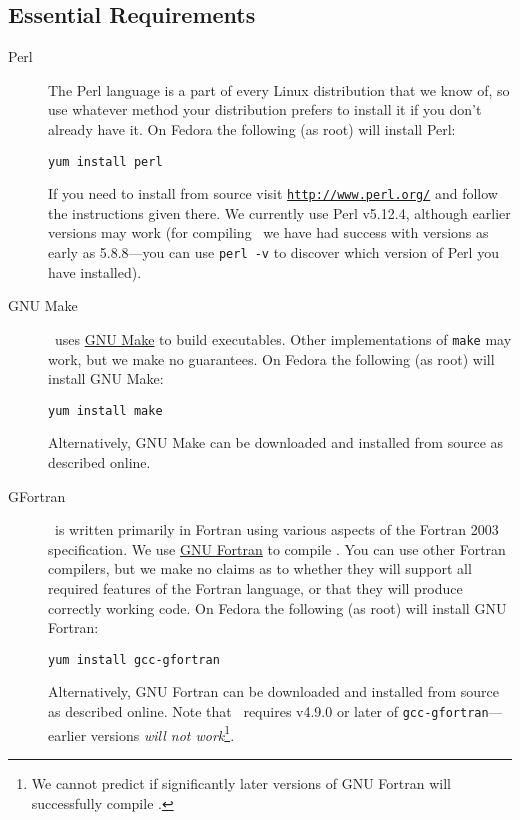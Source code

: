 \subsection{Essential Requirements}\label{sec:requirementsEssential}

\begin{description}
 \item [Perl] The Perl language is a part of every Linux distribution that we know of, so use whatever method your distribution prefers to install it if you don't already have it. On Fedora the following (as root) will install Perl:
\begin{verbatim}
yum install perl
\end{verbatim}
If you need to install from source visit \href{http://www.perl.org/}{\tt http://www.perl.org/} and follow the instructions given there. We currently use Perl v5.12.4, although earlier versions may work (for compiling \glc\ we have had success with versions as early as 5.8.8---you can use {\tt perl -v} to discover which version of Perl you have installed).

\item [GNU Make] \glc\ uses \href{http://www.gnu.org/software/make/}{GNU Make} to build executables. Other implementations of {\tt make} may work, but we make no guarantees. On Fedora the following (as root) will install GNU Make:
\begin{verbatim}
yum install make
\end{verbatim}
Alternatively, GNU Make can be downloaded and installed from source as described online.

\item [GFortran] \glc\ is written primarily in Fortran using various aspects of the Fortran 2003 specification. We use \href{http://gcc.gnu.org/fortran/}{GNU Fortran} to compile \glc. You can use other Fortran compilers, but we make no claims as to whether they will support all required features of the Fortran language, or that they will produce correctly working code. On Fedora the following (as root) will install GNU Fortran:
\begin{verbatim}
yum install gcc-gfortran
\end{verbatim}
Alternatively, GNU Fortran can be downloaded and installed from source as described online. Note that \glc\ requires v4.9.0 or later of {\tt gcc-gfortran}---earlier versions \emph{will not work}\footnote{We cannot predict if significantly later versions of GNU Fortran will successfully compile \protect\glc.}.


\end{description}
